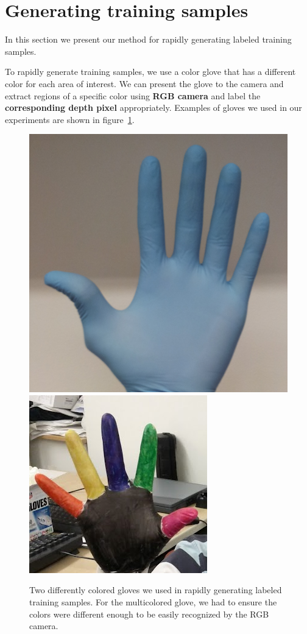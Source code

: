 \section{Generating training samples}
\label{sec: generating_training}

In this section we present our method for rapidly generating labeled training samples.

To rapidly generate training samples, we use a color glove that has a different color for each area of interest. We can present the glove to the camera and extract regions of a specific color using \textbf{RGB camera} and label the \textbf{corresponding depth pixel} appropriately. Examples of gloves we used in our experiments are shown in figure~\ref{fig:gloves}.

\begin{figure}
\begin{center}
\includegraphics[width=0.23 \textwidth]{fig/blueglove.png}
\includegraphics[width=0.23 \textwidth]{fig/colorglove.png}
\end{center}
\caption{Two differently colored gloves we used in rapidly generating labeled training samples. For the multicolored glove, we had to ensure the colors were different enough to be easily recognized by the RGB camera.}
\label{fig:gloves}
\end{figure}

